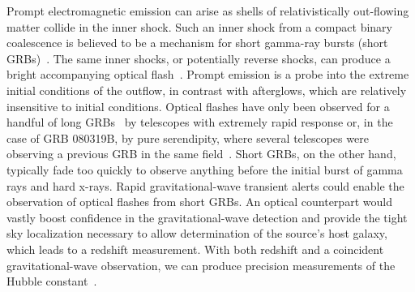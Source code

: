 Prompt electromagnetic emission can arise as shells of relativistically
out-flowing matter collide in the inner shock. Such an inner shock from a
compact binary coalescence is believed to be a mechanism for short gamma-ray
bursts (short GRBs)~\cite{Lee:2005, nakar07}. The same inner shocks, or
potentially reverse shocks, can produce a bright accompanying optical flash~\cite{Sari99}. Prompt emission is a probe into the extreme
initial conditions of the outflow, in contrast with afterglows, which are
relatively insensitive to initial conditions. Optical flashes
have only been observed for a handful of long
GRBs~\cite{1999Natur.398..400A,2003Natur.422..284F,2006A&A...454L.119J,0004-637X-660-1-489,2008Natur.455..183R,2011A&A...528A..15G}
by telescopes with extremely rapid response or, in the case of GRB 080319B, by
pure serendipity, where several telescopes were observing a previous GRB in the
same field~\cite{2008Natur.455..183R}. Short GRBs, on the other hand, typically
fade too quickly to observe anything before the initial burst of gamma rays and hard
x-rays. Rapid gravitational-wave transient alerts could enable the observation
of optical flashes from short GRBs. An optical counterpart would vastly boost
confidence in the gravitational-wave detection and provide the tight sky
localization necessary to allow determination of the source's host galaxy,
which leads to a redshift measurement. With both redshift and a coincident
gravitational-wave observation, we can produce precision measurements of the
Hubble constant~\cite{2010ApJ...725..496N}.

